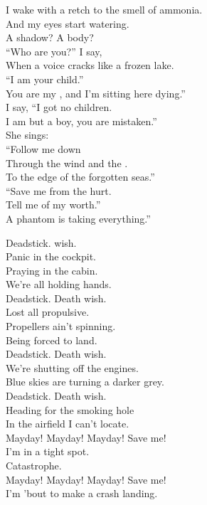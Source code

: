 
I wake with a retch to the smell of ammonia. \\
And my eyes start watering. \\
A shadow? A body? \\
``Who are you?'' I say, \\
When a voice cracks like a frozen lake. \\
``I am your child.'' \\
You are my , and I'm sitting here dying.'' \\
I say, ``I got no children. \\
I am but a boy, you are mistaken.'' \\

She sings: \\
``Follow me down \\
Through the wind and the . \\
To the edge of the forgotten seas.'' \\
``Save me from the hurt. \\
Tell me of my worth.'' \\
A phantom is taking everything.'' \\


Deadstick.  wish. \\
Panic in the cockpit. \\
Praying in the cabin. \\
We're all holding hands. \\
Deadstick. Death wish. \\
Lost all propulsive. \\
Propellers ain't spinning. \\
Being forced to land. \\

Deadstick. Death wish. \\
We're shutting off the engines. \\
Blue skies are turning a darker grey. \\
Deadstick. Death wish. \\
Heading for the smoking hole \\
In the airfield I can't locate. \\

Mayday! Mayday! Mayday! Save me! \\
I'm in a tight spot. \\
Catastrophe. \\
Mayday! Mayday! Mayday! Save me! \\
I'm 'bout to make a crash landing. \\

